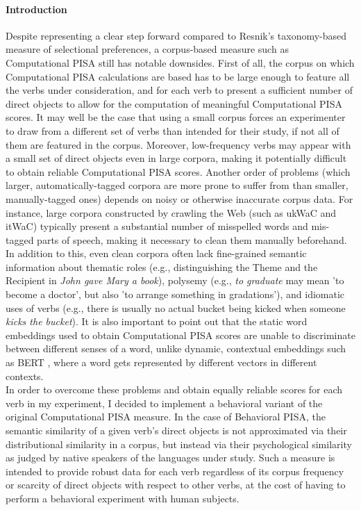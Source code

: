 \paragraph{Introduction} 
Despite representing a clear step forward compared to Resnik's taxonomy-based measure of selectional preferences, a corpus-based measure such as Computational PISA still has notable downsides. First of all, the corpus on which Computational PISA calculations are based has to be large enough to feature all the verbs under consideration, and for each verb to present a sufficient number of direct objects to allow for the computation of meaningful Computational PISA scores. It may well be the case that using a small corpus forces an experimenter to draw from a different set of verbs than intended for their study, if not all of them are featured in the corpus. Moreover, low-frequency verbs may appear with a small set of direct objects even in large corpora, making it potentially difficult to obtain reliable Computational PISA scores. Another order of problems (which larger, automatically-tagged corpora are more prone to suffer from than smaller, manually-tagged ones) depends on noisy or otherwise inaccurate corpus data. For instance, large corpora constructed by crawling the Web (such as ukWaC and itWaC) typically present a substantial number of misspelled words and mis-tagged parts of speech, making it necessary to clean them manually beforehand. In addition to this, even clean corpora often lack fine-grained semantic information about thematic roles (e.g., distinguishing the Theme and the Recipient in \textit{John gave Mary a book}), polysemy (e.g., \textit{to graduate} may mean 'to become a doctor', but also 'to arrange something in gradations'), and idiomatic uses of verbs (e.g., there is usually no actual bucket being kicked when someone \textit{kicks the bucket}). It is also important to point out that the static word embeddings used to obtain Computational PISA scores are unable to discriminate between different senses of a word, unlike dynamic, contextual embeddings such as BERT \parencite{devlin2018bert}, where a word gets represented by different vectors in different contexts.\\
In order to overcome these problems and obtain equally reliable scores for each verb in my experiment, I decided to implement a behavioral variant of the original Computational PISA measure. In the case of Behavioral PISA, the semantic similarity of a given verb's direct objects is not approximated via their distributional similarity in a corpus, but instead via their psychological similarity as judged by native speakers of the languages under study. Such a measure is intended to provide robust data for each verb regardless of its corpus frequency or scarcity of direct objects with respect to other verbs, at the cost of having to perform a behavioral experiment with human subjects.

